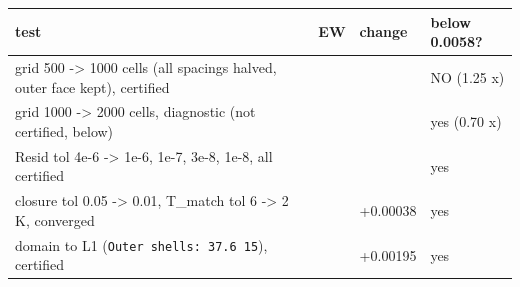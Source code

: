 \documentclass[english,a4paper]{my_memo}
\begin{document}
{\def\LTcaptype{none} %
{\small
\begin{longtable}[]{@{}>{\raggedright\arraybackslash}p{\dimexpr(\linewidth-8\tabcolsep)/4\relax}>{\raggedright\arraybackslash}p{\dimexpr(\linewidth-8\tabcolsep)/4\relax}>{\raggedright\arraybackslash}p{\dimexpr(\linewidth-8\tabcolsep)/4\relax}>{\raggedright\arraybackslash}p{\dimexpr(\linewidth-8\tabcolsep)/4\relax}@{}}
\toprule\noalign{}
test & EW & change & below 0.0058? \\
\midrule\noalign{}
\endhead
\bottomrule\noalign{}
\endlastfoot
grid 500 -\textgreater{} 1000 cells (all spacings halved, outer face kept), certified & 0.845660 & -0.00726 & NO (1.25 x) \\
grid 1000 -\textgreater{} 2000 cells, diagnostic (not certified, below) & 0.841623 & -0.00404 & yes (0.70 x) \\
Resid tol 4e-6 -\textgreater{} 1e-6, 1e-7, 3e-8, 1e-8, all certified & 0.852918 & 0 & yes \\
closure tol 0.05 -\textgreater{} 0.01, T\_match tol 6 -\textgreater{} 2 K, converged & 0.853294 & +0.00038 & yes \\
domain to L1 (\texttt{Outer\ shells:\ 37.6\ 15}), certified & 0.854864 & +0.00195 & yes \\
\end{longtable}
}
}
\end{document}
